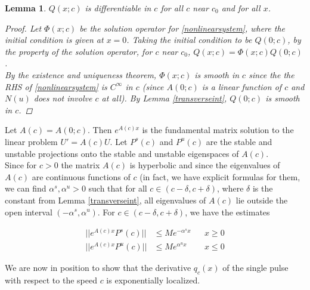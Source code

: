 \documentclass[12pt]{article}
\newtheorem{lemma}{Lemma}
\begin{document}
\begin{lemma}\label{qcexists}
$Q(x; c)$ is differentiable in $c$ for all $c$ near $c_0$ and for all $x$. 
\begin{proof}
Let $\Phi(x; c)$ be the solution operator for \eqref{nonlinearsystem}, where the initial condition is given at $x = 0$. Taking the initial condition to be $Q(0; c)$, by the property of the solution operator, for $c$ near $c_0$, $Q(x; c) = \Phi(x; c)Q(0; c)$.\\

By the existence and uniqueness theorem, $\Phi(x; c)$ is smooth in $c$ since the the RHS of \eqref{nonlinearsystem} is $C^\infty$ in $c$ (since $A(0; c)$ is a linear function of $c$ and $N(u)$ does not involve $c$ at all). By Lemma \ref{transverseint}, $Q(0; c)$ is smooth in $c$.
\end{proof}
\end{lemma}

Let $A(c) = A(0; c)$. Then $e^{A(c)x}$ is the fundamental matrix solution to the linear problem $U' = A(c) U$. Let $P^s(c)$ and $P^u(c)$ are the stable and unstable projections onto the stable and unstable eigenspaces of $A(c)$.\\

Since for $c > 0$ the matrix $A(c)$ is hyperbolic and since the eigenvalues of $A(c)$ are continuous functions of $c$ (in fact, we have explicit formulas for them, we can find $\alpha^s, \alpha^u > 0$ such that for all $c \in (c - \delta, c + \delta)$, where $\delta$ is the constant from Lemma \ref{transverseint}, all eigenvalues of $A(c)$ lie outside the open interval $(-\alpha^s, \alpha^u)$. For $c \in (c - \delta, c + \delta)$, we have the estimates

\begin{align*}
||e^{A(c)x}P^s(c)|| &\leq Me^{-\alpha^s x} && x \geq 0\\
||e^{A(c)x}P^u(c)|| &\leq Me^{\alpha^u x} && x \leq 0
\end{align*}

We are now in position to show that the derivative $q_c(x)$ of the single pulse with respect to the speed $c$ is exponentially localized.
\end{document}
